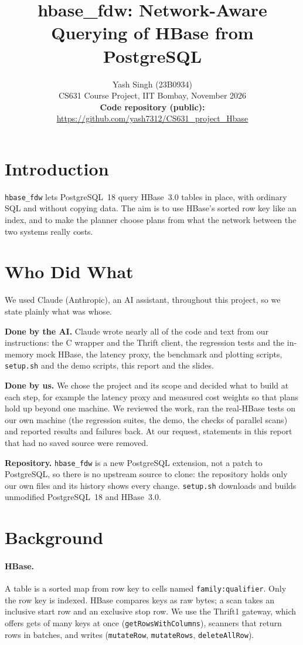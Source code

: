 \documentclass[11pt,a4paper]{article}
\title{\sffamily\bfseries hbase\_fdw: Network-Aware Querying of HBase from PostgreSQL}
\author{Yash Singh (23B0934)\\[2pt]
\small CS631 Course Project, IIT Bombay, November 2026\\[4pt]
\normalsize\textbf{Code repository (public):} \url{https://github.com/yash7312/CS631_project_Hbase}}
\date{}
\newcommand{\code}[1]{\texttt{#1}}
\begin{document}
\maketitle

\section{Introduction}
\code{hbase\_fdw} lets PostgreSQL~18 query HBase~3.0 tables in place, with ordinary SQL and without copying data. The aim is to use HBase's sorted row key like an index, and to make the planner choose plans from what the network between the two systems really costs.

\section{Who Did What}
We used Claude (Anthropic), an AI assistant, throughout this project, so we state plainly what was whose.

\textbf{Done by the AI.} Claude wrote nearly all of the code and text from our instructions: the C wrapper and the Thrift client, the regression tests and the in-memory mock HBase, the latency proxy, the benchmark and plotting scripts, \code{setup.sh} and the demo scripts, this report and the slides.

\textbf{Done by us.} We chose the project and its scope and decided what to build at each step, for example the latency proxy and measured cost weights so that plans hold up beyond one machine. We reviewed the work, ran the real-HBase tests on our own machine (the regression suites, the demo, the checks of parallel scans) and reported results and failures back. At our request, statements in this report that had no saved source were removed.

\textbf{Repository.} \code{hbase\_fdw} is a new PostgreSQL extension, not a patch to PostgreSQL, so there is no upstream source to clone: the repository holds only our own files and its history shows every change. \code{setup.sh} downloads and builds unmodified PostgreSQL~18 and HBase~3.0.

\section{Background}
\paragraph{HBase.} A table is a sorted map from row key to cells named \code{family:qualifier}. Only the row key is indexed. HBase compares keys as raw bytes; a scan takes an inclusive start row and an exclusive stop row. We use the Thrift1 gateway, which offers gets of many keys at once (\code{getRowsWithColumns}), scanners that return rows in batches, and writes (\code{mutateRow}, \code{mutateRows}, \code{deleteAllRow}).
\end{document}
